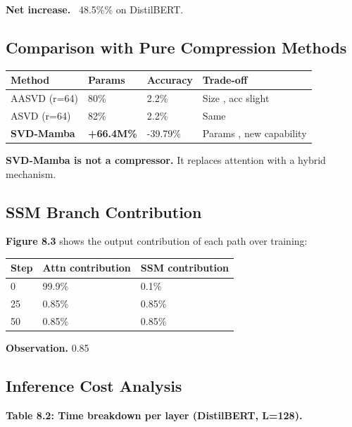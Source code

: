 \textbf{Net increase.} ~48.5\%\% on DistilBERT.

\subsection{Comparison with Pure Compression Methods}

\begin{table}[H]
\centering
\small
\begin{tabular}{llll}
\toprule
\textbf{Method} & \textbf{Params} & \textbf{Accuracy} & \textbf{Trade-off} \\
\midrule
AASVD (r=64) & 80\% & 2.2\% & Size  , acc slight \\
ASVD (r=64) & 82\% & 2.2\% & Same \\
\textbf{SVD-Mamba} & \textbf{+66.4M\%} & -39.79\% & Params  , new capability \\
\bottomrule
\end{tabular}
\end{table}

\textbf{SVD-Mamba is not a compressor.} It replaces attention with a hybrid 
mechanism.

\subsection{SSM Branch Contribution}

\textbf{Figure 8.3} shows the output contribution of each path over training:

\begin{table}[H]
\centering
\small
\begin{tabular}{lll}
\toprule
\textbf{Step} & \textbf{Attn contribution} & \textbf{SSM contribution} \\
\midrule
0 & 99.9\% & 0.1\% \\
25 & 0.85\% & 0.85\% \\
50 & 0.85\% & 0.85\% \\
\bottomrule
\end{tabular}
\end{table}

\textbf{Observation.} 0.85

\subsection{Inference Cost Analysis}

\textbf{Table 8.2: Time breakdown per layer (DistilBERT, L=128).}

